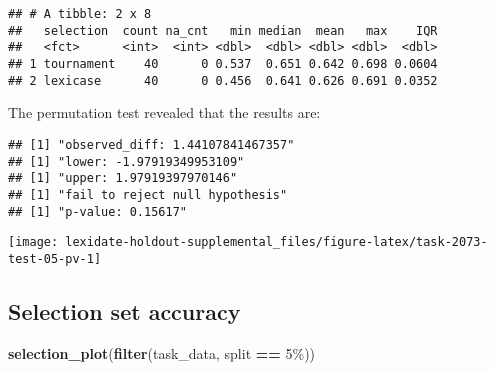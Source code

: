\documentclass[
]{book}
\newenvironment{Shaded}{\begin{snugshade}}{\end{snugshade}}
\newcommand{\AttributeTok}[1]{\textcolor[rgb]{0.13,0.29,0.53}{#1}}
\newcommand{\DecValTok}[1]{\textcolor[rgb]{0.00,0.00,0.81}{#1}}
\newcommand{\FunctionTok}[1]{\textcolor[rgb]{0.13,0.29,0.53}{\textbf{#1}}}
\newcommand{\NormalTok}[1]{#1}
\newcommand{\OtherTok}[1]{\textcolor[rgb]{0.56,0.35,0.01}{#1}}
\newcommand{\SpecialCharTok}[1]{\textcolor[rgb]{0.81,0.36,0.00}{\textbf{#1}}}
\newcommand{\StringTok}[1]{\textcolor[rgb]{0.31,0.60,0.02}{#1}}
\begin{document}
\begin{verbatim}
## # A tibble: 2 x 8
##   selection  count na_cnt   min median  mean   max    IQR
##   <fct>      <int>  <int> <dbl>  <dbl> <dbl> <dbl>  <dbl>
## 1 tournament    40      0 0.537  0.651 0.642 0.698 0.0604
## 2 lexicase      40      0 0.456  0.641 0.626 0.691 0.0352
\end{verbatim}

The permutation test revealed that the results are:

\begin{Shaded}
\end{Shaded}

\begin{verbatim}
## [1] "observed_diff: 1.44107841467357"
## [1] "lower: -1.97919349953109"
## [1] "upper: 1.97919397970146"
## [1] "fail to reject null hypothesis"
## [1] "p-value: 0.15617"
\end{verbatim}

\texttt{[image: lexidate-holdout-supplemental\_files/figure-latex/task-2073-test-05-pv-1]}

\hypertarget{selection-set-accuracy-40}{%
\subsection{Selection set accuracy}\label{selection-set-accuracy-40}}

\begin{Shaded}
\begin{Highlighting}[]
\FunctionTok{selection\_plot}\NormalTok{(}\FunctionTok{filter}\NormalTok{(task\_data, split }\SpecialCharTok{==} \StringTok{\textquotesingle{}5\%\textquotesingle{}}\NormalTok{))}
\end{Highlighting}
\end{Shaded}
\end{document}
